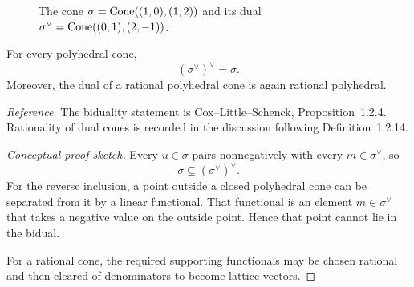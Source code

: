 \begin{figure}[ht]
\centering
{}
\caption{The cone
\(\sigma=\operatorname{Cone}((1,0),(1,2))\) and its dual
\(\sigma^\vee=\operatorname{Cone}((0,1),(2,-1))\).}
\label{fig:cone-and-dual-cone-example}
\end{figure}

\begin{proposition}[Biduality]
\label{prop:biduality-polyhedral-cones}
For every polyhedral cone,
\[
(\sigma^\vee)^\vee=\sigma.
\]
Moreover, the dual of a rational polyhedral cone is again rational
polyhedral.
\end{proposition}

\noindent
\textit{Reference.}
The biduality statement is Cox--Little--Schenck,
Proposition~1.2.4. Rationality of dual cones is recorded in the
discussion following Definition~1.2.14.

\begin{proof}[Conceptual proof sketch]
Every \(u\in\sigma\) pairs nonnegatively with every
\(m\in\sigma^\vee\), so
\[
\sigma\subseteq(\sigma^\vee)^\vee.
\]
For the reverse inclusion, a point outside a closed polyhedral cone
can be separated from it by a linear functional. That functional is
an element \(m\in\sigma^\vee\) that takes a negative value on the
outside point. Hence that point cannot lie in the bidual.

For a rational cone, the required supporting functionals may be
chosen rational and then cleared of denominators to become lattice
vectors.
\end{proof}

